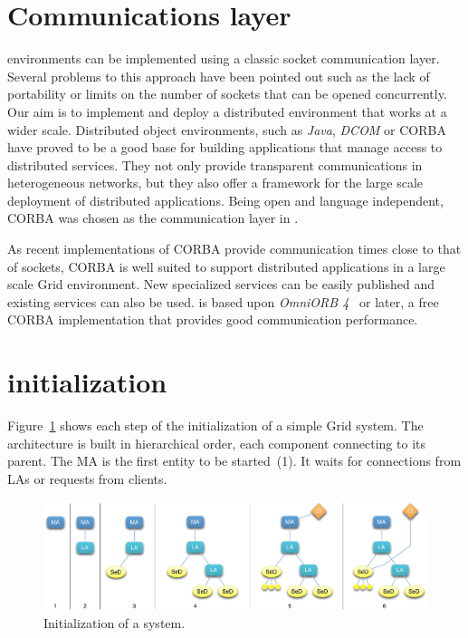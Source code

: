 \section{Communications layer}
\label{sec:CORBA}

\nes environments can be implemented using a classic socket communication
layer. Several problems to this approach have been pointed out such as the lack
of portability or limits on the number of sockets that can be opened
concurrently. Our aim is to implement and deploy a distributed \nes environment
that works at a wider scale. Distributed object environments, such as
\emph{Java}, \emph{DCOM} or CORBA have proved to be a good base for building
applications that manage access to distributed services. They not only provide
transparent communications in heterogeneous networks, but they also offer a
framework for the large scale deployment of distributed applications. Being
open and language independent, CORBA was chosen as the communication layer in
\diet.

As recent implementations of CORBA provide communication times close
to that of sockets, CORBA is well suited to support distributed
applications in a large scale Grid environment. New specialized
services can be easily published and existing services can also be
used.  \diet is based upon \emph{OmniORB 4}~\cite{OMNIORB} or later, a
free CORBA implementation that provides good communication
performance.



\section{\diet initialization}
\label{init}

Figure~\ref{fig:init} shows each step of the initialization of a simple Grid
system. The architecture is built in hierarchical order, each component
connecting to its parent. The MA is the first entity to be started~(1). It
waits for connections from LAs or requests from clients.

\begin{figure}[hbt]
  \begin{center}
    \includegraphics[scale=.35]{fig/init}
    \caption{Initialization of a \diet system.}
    \label{fig:init}
  \end{center}
\end{figure}

